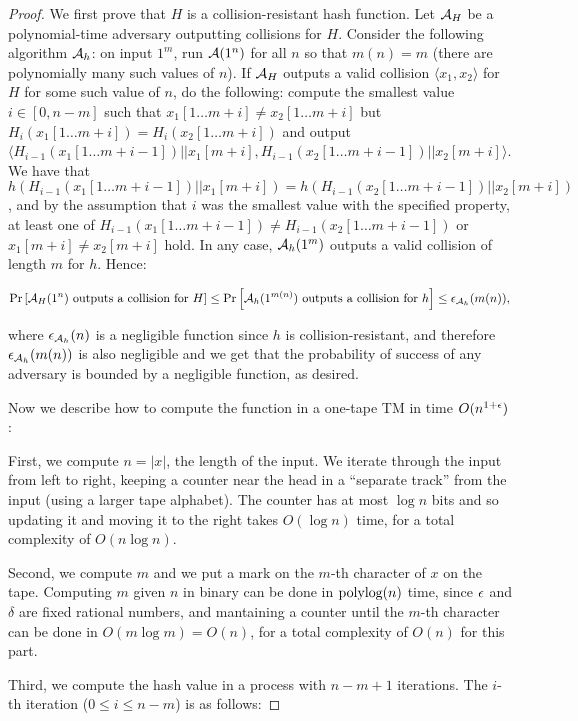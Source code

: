 \begin{proof}
We first prove that $H$ is a collision-resistant hash function.
Let $\mathcal{A}_H$ be a polynomial-time adversary outputting collisions for $H$. Consider the following algorithm
$\mathcal{A}_h$: on input $1^m$, run $\mathcal{A}(1^n)$ for all $n$ so that $m(n) = m$
(there are polynomially many such values of $n$). 
If $\mathcal{A}_H$ outputs a valid collision $\langle x_1, x_2 \rangle$ for $H$ for some such value of $n$,
do the following: compute the smallest value $i \in [0, n-m]$ such that $x_1[1 \ldots m+i] \neq x_2[1 \ldots m+i]$
but $H_i(x_1[1 \ldots m+i]) = H_i(x_2[1 \ldots m+i])$ and output
$\langle H_{i-1}(x_1[1 \ldots m+i-1]) || x_1[m+i], H_{i-1}(x_2[1 \ldots m+i-1]) || x_2[m+i] \rangle$.
We have that $h(H_{i-1}(x_1[1 \ldots m+i-1]) || x_1[m+i]) = h(H_{i-1}(x_2[1 \ldots m+i-1]) || x_2[m+i])$,
and by the assumption that $i$ was the smallest value with the specified property, at least one of
$H_{i-1}(x_1[1 \ldots m+i-1]) \neq H_{i-1}(x_2[1 \ldots m+i-1])$ or $x_1[m+i] \neq x_2[m+i]$
hold. In any case, $\mathcal{A}_h(1^m)$ outputs a valid collision of length $m$ for $h$. Hence:

$$
\text{Pr}\left[\mathcal{A}_H(1^n)  \text{ outputs a collision for } H \right] \leq \text{Pr}\left[\mathcal{A}_h(1^{m(n)}) \text{ outputs a collision for } h\right] \leq \epsilon_{\mathcal{A}_h}(m(n)),
$$

where $\epsilon_{\mathcal{A}_h}(n)$ is a negligible function since $h$ is collision-resistant, 
and therefore $\epsilon_{\mathcal{A}_h}(m(n))$ is also negligible and we get that the probability of success
of any adversary is bounded by a negligible function, as desired. 

Now we describe how to compute the function in a one-tape TM in time $O(n^{1+\epsilon})$:

First, we compute $n = |x|$, the length of the input. We iterate through the input from left to right,
keeping a counter near the head in a ``separate track'' from the input 
(using a larger tape alphabet).  
The counter has at most $\log n$ bits and so updating it and moving it to the right takes
$O(\log n)$ time, for a total complexity of $O(n \log n)$. 

Second, we compute $m$ and we put a mark on the $m$-th character of $x$ on the tape.
Computing $m$ given $n$ in binary can be done in $\text{polylog}(n)$ time, since
$\epsilon$ and $\delta$ are fixed rational numbers, and mantaining a counter until the $m$-th character can
be done in $O(m \log m) = O(n)$, for a total complexity of $O(n)$ for this part. 

Third, we compute the hash value in a process with $n-m+1$ iterations. The $i$-th iteration ($0 \leq i \leq n-m$) is 
as follows:


\end{proof}
